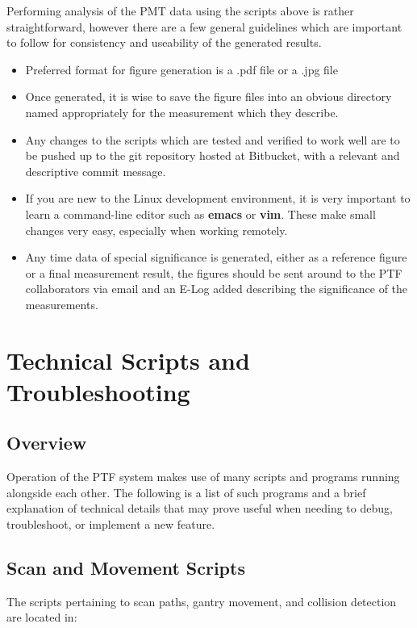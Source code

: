 \documentclass[twoside,letterpaper]{refart}
\begin{document}
Performing analysis of the PMT data using the scripts above is rather straightforward, however there are a few general guidelines which are important to follow for consistency and useability of the generated results.  

\begin{itemize}
	\item Preferred format for figure generation is a .pdf file or a .jpg file 
	\item Once generated, it is wise to save the figure files into an obvious directory named appropriately for the measurement which they describe.
	\item Any changes to the scripts which are tested and verified to work well are to be pushed up to the git repository hosted at Bitbucket, with a relevant and descriptive commit message.  
	\item If you are new to the Linux development environment, it is very important to learn a command-line editor such as \textbf{emacs} or \textbf{vim}.  These make small changes very easy, especially when working remotely. 
	\item Any time data of special significance is generated, either as a reference figure or a final measurement result, the figures should be sent around to the PTF collaborators via email and an E-Log added describing the significance of the measurements.
\end{itemize}

\clearpage

\section{Technical Scripts and Troubleshooting}

\subsection{Overview}

Operation of the PTF system makes use of many scripts and programs running alongside each other. The following is a list of such programs and a brief explanation of technical details that may prove useful when needing to debug, troubleshoot, or implement a new feature.

\subsection{Scan and Movement Scripts} \label{scanScripts}

The scripts pertaining to scan paths, gantry movement, and collision detection are located in:
\end{document}
